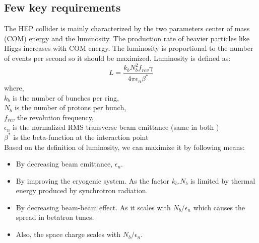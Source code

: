 \subsection{Few key requirements} %
\label{sub:few_key_requirements}

The HEP collider is mainly characterized by the two parameters center of mass (COM) energy and the luminosity. The production rate of heavier particles like Higgs increases with COM energy. The luminosity is proportional to the number of events per second so it should be maximized. Luminosity is defined as:
\begin{equation}
    L = \frac{k_bN_b^2f_{rev}\gamma}{4 \pi \epsilon_n \beta^*}
\end{equation}
where,\\
\hspace{2cm}$k_b$ is the number of bunches per ring,\\
\hspace{2cm}$N_b$ is the number of protons per bunch,\\
\hspace{2cm}$f_{rev}$ the revolution frequency,\\
\hspace{2cm}$\epsilon_n$ is the normalized RMS transverse beam emittance (same in both )\\
\hspace{2cm}$\beta^*$ is the beta-function at the interaction point\\

Based on the definition of luminosity, we can maximize it by following means:
\begin{itemize}
    \item By decreasing beam emittance, $\epsilon_n$.
    \item By improving the cryogenic system. As the factor $k_b.N_b$ is limited by thermal energy produced by synchrotron radiation.
    \item By decreasing beam-beam effect. As it scales with $N_b/ \epsilon_n$ which causes the spread in betatron tunes.
    \item Also, the space charge  scales with $N_b/ \epsilon_n$.
\end{itemize}

